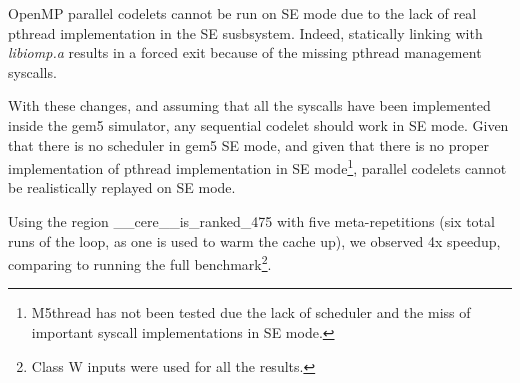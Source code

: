 \documentclass{article}
\begin{document}
\begin{multicols}{2}

OpenMP parallel codelets cannot be run on SE mode due to the lack of real pthread implementation in the SE susbsystem. Indeed, statically linking with \textit{libiomp.a} results in a forced exit because of the missing pthread management syscalls.

\medskip
With these changes, and assuming that all the syscalls have been implemented inside the gem5 simulator, any sequential codelet should work in SE mode. Given that there is no scheduler in gem5 SE mode, and given that there is no proper implementation of pthread implementation in SE mode\footnote{M5thread has not been tested due the lack of scheduler and the miss of important syscall implementations in SE mode.}, parallel codelets cannot be realistically replayed on SE mode.


\medskip
Using the region \_\_cere\_\_is\_ranked\_475 with five meta-repetitions (six total runs of the loop, as one is used to warm the cache up), we observed 4x speedup, comparing to running the full benchmark\footnote{Class W inputs were used for all the results.}.

\end{multicols}
\end{document}
